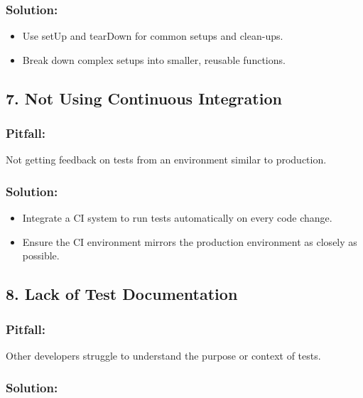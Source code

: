 \documentclass[
]{article}
\providecommand{\tightlist}{%
  \setlength{\itemsep}{0pt}\setlength{\parskip}{0pt}}
\begin{document}
\subsubsection{Solution:}\label{solution-5}

\begin{itemize}
\tightlist
\item
  Use setUp and tearDown for common setups and clean-ups.
\item
  Break down complex setups into smaller, reusable functions.
\end{itemize}

\subsection{7. Not Using Continuous
Integration}\label{not-using-continuous-integration}

\subsubsection{Pitfall:}\label{pitfall-6}

Not getting feedback on tests from an environment similar to production.

\subsubsection{Solution:}\label{solution-6}

\begin{itemize}
\tightlist
\item
  Integrate a CI system to run tests automatically on every code change.
\item
  Ensure the CI environment mirrors the production environment as
  closely as possible.
\end{itemize}

\subsection{8. Lack of Test
Documentation}\label{lack-of-test-documentation}

\subsubsection{Pitfall:}\label{pitfall-7}

Other developers struggle to understand the purpose or context of tests.

\subsubsection{Solution:}\label{solution-7}
\end{document}
